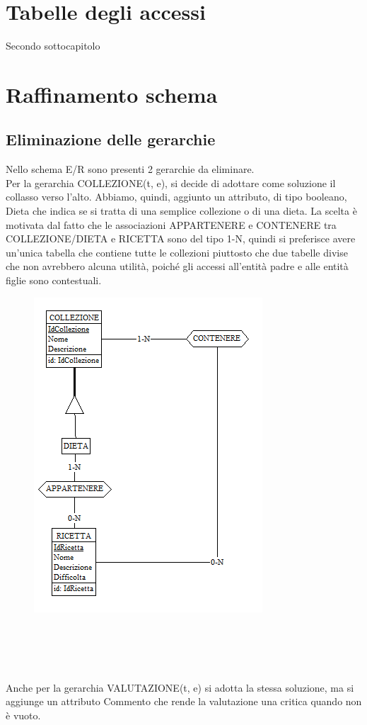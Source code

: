 ﻿\documentclass[a4paper,12pt]{report}
\begin{document}
\section{Tabelle degli accessi}
Secondo sottocapitolo
\section{Raffinamento schema}
\subsection{Eliminazione delle gerarchie}
Nello schema E/R sono presenti 2 gerarchie da eliminare.\\
Per la gerarchia COLLEZIONE(t, e), si decide di adottare come soluzione il collasso verso l'alto.
Abbiamo, quindi, aggiunto un attributo, di tipo booleano, Dieta che indica se si tratta di una semplice collezione o di una dieta.
La scelta è motivata dal fatto che le associazioni APPARTENERE e CONTENERE tra COLLEZIONE/DIETA e RICETTA sono del tipo 1-N, quindi si preferisce avere
un'unica tabella che contiene tutte le collezioni piuttosto che due tabelle divise che non avrebbero alcuna utilità, poiché gli accessi all'entità padre e alle entità figlie sono contestuali.\\
\begin{figure}[h!]
    \centering
    \includegraphics[width=0.6\linewidth]{app_images/gerarchia_collezione.png}
\end{figure}
\\\\\\\\Anche per la gerarchia VALUTAZIONE(t, e) si adotta la stessa soluzione, ma si aggiunge un attributo Commento che rende la valutazione una critica quando non è vuoto.\\
\end{document}
